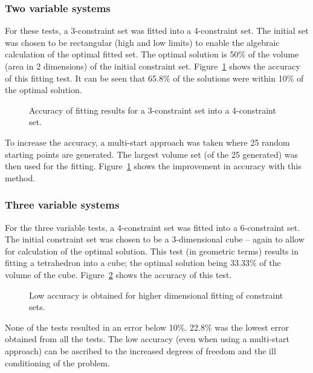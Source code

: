 \subsubsection{Two variable systems}\label{sec:2dfitting}
For these tests, a 3-constraint set was fitted into a 4-constraint set.
The initial set was chosen to be rectangular (high and low limits) to enable the algebraic calculation of the optimal fitted set.
The optimal solution is 50\% of the volume (area in 2 dimensions) of the initial constraint set.
Figure~\ref{fig:arbfitaccuracy2d} shows the accuracy of this fitting test.
It can be seen that 65.8\% of the solutions were within 10\% of the optimal solution.
\begin{figure}[htbp]
  \centering
    \scalebox{1}{}
  \caption[Accuracy of constraint set fitting for 2 variables]{Accuracy of fitting results for a 3-constraint set into a 4-constraint set.}
  \label{fig:arbfitaccuracy2d}
\end{figure}

To increase the accuracy, a multi-start approach was taken where 25 random starting points are generated.
The largest volume set (of the 25 generated) was then used for the fitting.
Figure~\ref{fig:arbfitaccuracy2d} shows the improvement in accuracy with this method.

\subsubsection{Three variable systems}
For the three variable tests, a 4-constraint set was fitted into a 6-constraint set.
The initial constraint set was chosen to be a 3-dimensional cube -- again to allow for calculation of the optimal solution.
This test (in geometric terms) results in fitting a tetrahedron into a cube; the optimal solution being 33.33\% of the volume of the cube.
Figure~\ref{fig:arbfitaccuracy3d} shows the accuracy of this test.

\begin{figure}[htbp]
  \centering
    \scalebox{1}{}
  \caption[Accuracy of constraint set fitting for 3 variables]{Low accuracy is obtained for higher dimensional fitting of constraint sets.}
  \label{fig:arbfitaccuracy3d}
\end{figure}

None of the tests resulted in an error below 10\%.
22.8\% was the lowest error obtained from all the tests.
The low accuracy (even when using a multi-start approach) can be ascribed to the increased degrees of freedom and the ill conditioning of the problem.

